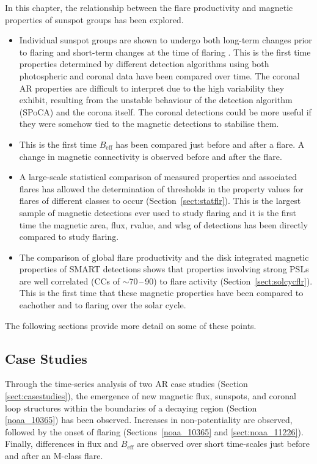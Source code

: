 In this chapter, the relationship between the flare productivity and magnetic properties of sunspot groups has been explored. 
\begin{itemize}
\item Individual sunspot groups are shown to undergo both long-term changes prior to flaring \citep[Section~\ref{noaa_10365}][]{Verbeeck:2011} and short-term changes at the time of flaring \citep[Section~\ref{sect:noaa_11226}][]{Bloomfield:2012b}. This is the first time properties determined by different detection algorithms using both photospheric and coronal data have been compared over time. The coronal AR properties are difficult to interpret due to the high variability they exhibit, resulting from the unstable behaviour of the detection algorithm (SPoCA) and the corona itself. The coronal detections could be more useful if they were somehow tied to the magnetic detections to stabilise them. 
\item This is the first time $B_{\mathrm{eff}}$ has been compared just before and after a flare. A change in magnetic connectivity is observed before and after the flare.
\item A large-scale statistical comparison of measured properties and associated flares has allowed the determination of thresholds in the property values for flares of different classes to occur (Section~\ref{sect:statflr}). This is the largest sample of magnetic detections ever used to study flaring and it is the first time the magnetic area, flux, \gls{rvalue}, and \gls{wlsg} of detections has been directly compared to study flaring. 
\item The comparison of global flare productivity and the disk integrated magnetic properties of \gls{SMART} detections shows that properties involving strong \glspl{PSL} are well correlated (\glspl{CC} of $\sim$70\,--\,90) to flare activity (Section~\ref{sect:solcycflr}). This is the first time that these magnetic properties have been compared to eachother and to flaring over the solar cycle.  
\end{itemize}
The following sections provide more detail on some of these points.

\subsection{Case Studies}
Through the time-series analysis of two \gls{AR} case studies (Section \ref{sect:casestudies}), the emergence of new magnetic flux, sunspots, and coronal loop structures within the boundaries of a decaying region (Section \ref{noaa_10365}) has been observed. Increases in non-potentiality are observed, followed by the onset of flaring (Sections~\ref{noaa_10365} and \ref{sect:noaa_11226}). Finally, differences in flux and $B_{\mathrm{eff}}$ are observed over short time-scales just before and after an M-class flare. 

